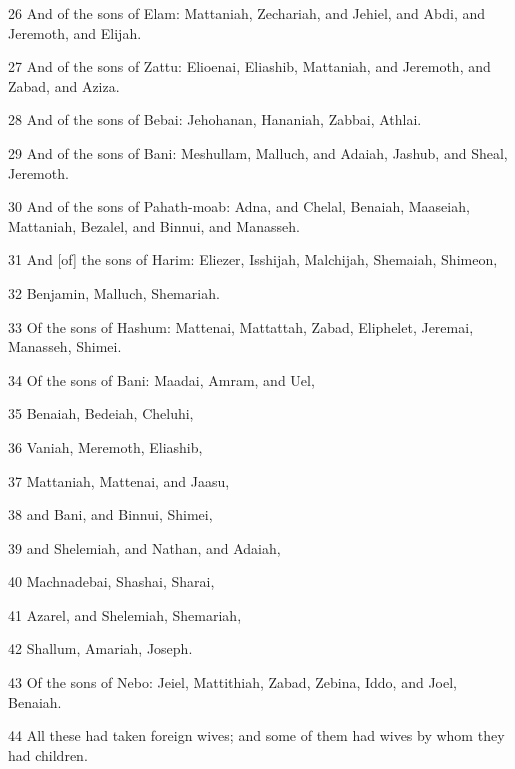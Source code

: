 \par 26 And of the sons of Elam: Mattaniah, Zechariah, and Jehiel, and Abdi, and Jeremoth, and Elijah.
\par 27 And of the sons of Zattu: Elioenai, Eliashib, Mattaniah, and Jeremoth, and Zabad, and Aziza.
\par 28 And of the sons of Bebai: Jehohanan, Hananiah, Zabbai, Athlai.
\par 29 And of the sons of Bani: Meshullam, Malluch, and Adaiah, Jashub, and Sheal, Jeremoth.
\par 30 And of the sons of Pahath-moab: Adna, and Chelal, Benaiah, Maaseiah, Mattaniah, Bezalel, and Binnui, and Manasseh.
\par 31 And [of] the sons of Harim: Eliezer, Isshijah, Malchijah, Shemaiah, Shimeon,
\par 32 Benjamin, Malluch, Shemariah.
\par 33 Of the sons of Hashum: Mattenai, Mattattah, Zabad, Eliphelet, Jeremai, Manasseh, Shimei.
\par 34 Of the sons of Bani: Maadai, Amram, and Uel,
\par 35 Benaiah, Bedeiah, Cheluhi,
\par 36 Vaniah, Meremoth, Eliashib,
\par 37 Mattaniah, Mattenai, and Jaasu,
\par 38 and Bani, and Binnui, Shimei,
\par 39 and Shelemiah, and Nathan, and Adaiah,
\par 40 Machnadebai, Shashai, Sharai,
\par 41 Azarel, and Shelemiah, Shemariah,
\par 42 Shallum, Amariah, Joseph.
\par 43 Of the sons of Nebo: Jeiel, Mattithiah, Zabad, Zebina, Iddo, and Joel, Benaiah.
\par 44 All these had taken foreign wives; and some of them had wives by whom they had children.

